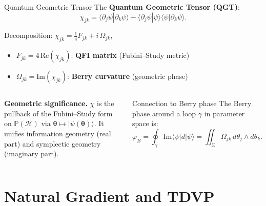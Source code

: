 \documentclass[aspectratio=169,10pt]{beamer}
\newcommand{\btheta}{\boldsymbol{\theta}}
\newcommand{\hilb}{\mathcal{H}}
\begin{document}
\begin{frame}{Quantum Geometric Tensor}
  The \textbf{Quantum Geometric Tensor (QGT)}:
  \[
    \chi_{jk}
    = \langle\partial_j\psi|\partial_k\psi\rangle
     -\langle\partial_j\psi|\psi\rangle
      \langle\psi|\partial_k\psi\rangle.
  \]

  Decomposition: $\chi_{jk} = \frac{1}{4}F_{jk} + i\,\Omega_{jk}$,
  \begin{itemize}\itemsep2pt
    \item $F_{jk} = 4\,\mathrm{Re}(\chi_{jk})$:
          \textbf{QFI matrix} (Fubini--Study metric)
    \item $\Omega_{jk} = \mathrm{Im}(\chi_{jk})$:
          \textbf{Berry curvature} (geometric phase)
  \end{itemize}

  \begin{columns}[T]
    \textbf{Geometric significance.}
    $\chi$ is the pullback of the Fubini--Study form on
    $\mathbb{P}(\hilb)$ via $\btheta\mapsto|\psi(\btheta)\rangle$.
    It unifies information geometry (real part) and
    symplectic geometry (imaginary part).
    \begin{alertblock}{Connection to Berry phase}
      The Berry phase around a loop $\gamma$
      in parameter space is:
      \[
        \varphi_B = \oint_\gamma
          \mathrm{Im}\langle\psi|d|\psi\rangle
        = \iint_\Sigma \Omega_{jk}\,d\theta_j\wedge d\theta_k.
      \]
    \end{alertblock}
  \end{columns}
\end{frame}

\section{Natural Gradient and TDVP}
\end{document}
